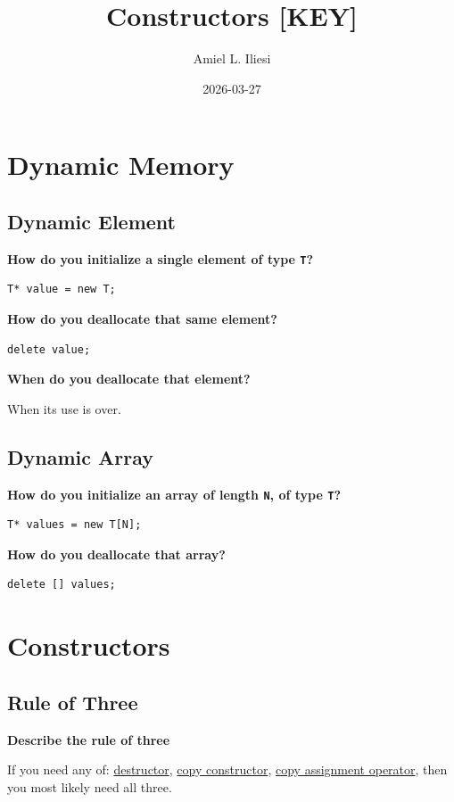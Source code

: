 \documentclass[letterpaper, 12pt]{article}
\title{Constructors \color{red}\textbf{[KEY]}}
\author{Amiel L. Iliesi}
\date{2026-03-27}
\newcommand{\question}[1]{\textbf{#1}\par}
\newenvironment{ansblock}{\color{Green4}}{\normalcolor\vspace{1em}}
\begin{document}
\maketitle

\tableofcontents

\pagebreak
\section{Dynamic Memory}

\subsection{Dynamic Element}
\question{How do you initialize a single element of type \texttt{T}?}
\begin{verbatim}
T* value = new T;
\end{verbatim}

\question{How do you deallocate that same element?}
\begin{verbatim}
delete value;
\end{verbatim}

\question{When do you deallocate that element?}
\begin{ansblock}
When its use is over.
\end{ansblock}

\subsection{Dynamic Array}
\question{How do you initialize an array of length \texttt{N}, of type
\texttt{T}?}

\begin{verbatim}
T* values = new T[N];
\end{verbatim}

\question{How do you deallocate that array?}

\begin{verbatim}
delete [] values;
\end{verbatim}

\pagebreak
\section{Constructors}

\subsection{Rule of Three}
\question{Describe the rule of three}
\begin{ansblock}
If you need any of: \uline{destructor}, \uline{copy constructor}, 
\uline{copy assignment operator}, then you most likely need all three.
\end{ansblock}
\end{document}
